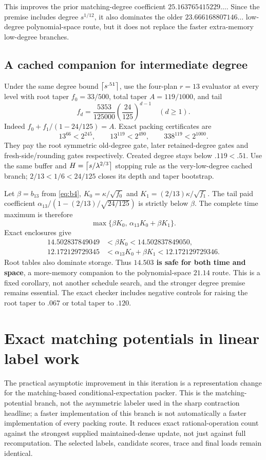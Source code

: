 \documentclass[11pt,letterpaper]{article}
\theoremstyle{remark}\newtheorem{remark}[theorem]{Remark}
\begin{document}
This improves the prior matching-degree coefficient $25.163765415229\ldots$. Since the premise includes degree $s^{1/12}$, it also dominates the older $23.666168807146\ldots$ low-degree polynomial-space route, but it does not replace the faster extra-memory low-degree branches.



\subsection{A cached companion for intermediate degree}
Under the same degree bound $\left\lceil s^{.51}\right\rceil$, use the four-plan $r=13$ evaluator at every level with root taper $f_0=33/500$, total taper $A=119/1000$, and tail
\[
 f_d=\frac{5353}{125000}\left(\frac{24}{125}\right)^{d-1}
 \quad(d\ge1).
\]
Indeed $f_0+f_1/(1-24/125)=A$. Exact packing certificates are
\[
 13^{66}<2^{245},\qquad13^{119}<2^{490},\qquad338^{119}<2^{1000}.
\]
They pay the root symmetric old-degree gate, later retained-degree gates and fresh-side/rounding gates respectively. Created degree stays below $.119<.51$. Use the same buffer and $H=\left\lceil s/\lambda^{2/3}\right\rceil$ stopping rule as the very-low-degree cached branch; $2/13<1/6<24/125$ closes its depth and taper bootstrap.

Let $\beta=b_{13}$ from \eqref{eq:b4}, $K_0=\kappa/\sqrt{f_0}$ and $K_1=(2/13)\kappa/\sqrt{f_1}$. The tail paid coefficient $\alpha_{13}/(1-(2/13)/\sqrt{24/125})$ is strictly below $\beta$. The complete time maximum is therefore
\[
 \max\{\beta K_0,\,\alpha_{13}K_0+\beta K_1\}.
\]
Exact enclosures give
\begin{align*}
14.502837849049&<\beta K_0<14.502837849050,\\
12.172129729345&<\alpha_{13}K_0+\beta K_1<12.172129729346.
\end{align*} Root tables also dominate storage. Thus \textbf{$14.503$ is safe for both time and space}, a more-memory companion to the polynomial-space $21.14$ route. This is a fixed corollary, not another schedule search, and the stronger degree premise remains essential. The exact checker includes negative controls for raising the root taper to $.067$ or total taper to $.120$.

\section{Exact matching potentials in linear label work}
\label{sec:matching}
The practical asymptotic improvement in this iteration is a representation change for the matching-based conditional-expectation packer. This is the matching-potential branch, not the asymmetric labeler used in the sharp contraction headline; a faster implementation of this branch is not automatically a faster implementation of every packing route. It reduces exact rational-operation count against the strongest supplied maintained-dense update, not just against full recomputation. The selected labels, candidate scores, trace and final loads remain identical.
\end{document}
